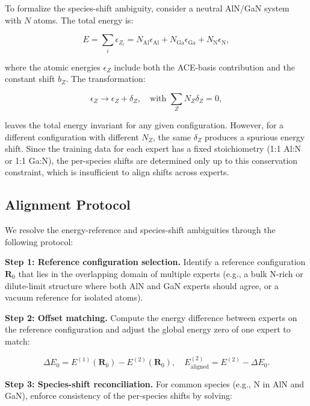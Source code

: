 \documentclass[twoside,prb,aps,floatfix,superscriptaddress,longbibliography]{revtex4-2}
\begin{document}
To formalize the species-shift ambiguity, consider a neutral AlN/GaN system with $N$ atoms. The total energy is:

\begin{equation}
E = \sum_i \epsilon_{Z_i} = N_{\mathrm{Al}} \epsilon_{\mathrm{Al}} + N_{\mathrm{Ga}} \epsilon_{\mathrm{Ga}} + N_{\mathrm{N}} \epsilon_{\mathrm{N}},
\label{eq:total_energy_decomp}
\end{equation}

where the atomic energies $\epsilon_Z$ include both the ACE-basis contribution and the constant shift $b_Z$. The transformation:

\begin{equation}
\epsilon_Z \to \epsilon_Z + \delta_Z, \quad \text{with } \sum_Z N_Z \delta_Z = 0,
\label{eq:species_shift}
\end{equation}

leaves the total energy invariant for any given configuration. However, for a different configuration with different $N_Z$, the same $\delta_Z$ produces a spurious energy shift. Since the training data for each expert has a fixed stoichiometry (1:1 Al:N or 1:1 Ga:N), the per-species shifts are determined only up to this conservation constraint, which is insufficient to align shifts across experts.

\subsection{Alignment Protocol}

We resolve the energy-reference and species-shift ambiguities through the following protocol:

\textbf{Step 1: Reference configuration selection.} Identify a reference configuration $\mathbf{R}_0$ that lies in the overlapping domain of multiple experts (e.g., a bulk N-rich or dilute-limit structure where both AlN and GaN experts should agree, or a vacuum reference for isolated atoms).

\textbf{Step 2: Offset matching.} Compute the energy difference between experts on the reference configuration and adjust the global energy zero of one expert to match:

\begin{equation}
\Delta E_0 = E^{(1)}(\mathbf{R}_0) - E^{(2)}(\mathbf{R}_0), \quad E^{(2)}_{\mathrm{aligned}} = E^{(2)} - \Delta E_0.
\label{eq:offset_matching}
\end{equation}

\textbf{Step 3: Species-shift reconciliation.} For common species (e.g., N in AlN and GaN), enforce consistency of the per-species shifts by solving:
\end{document}
